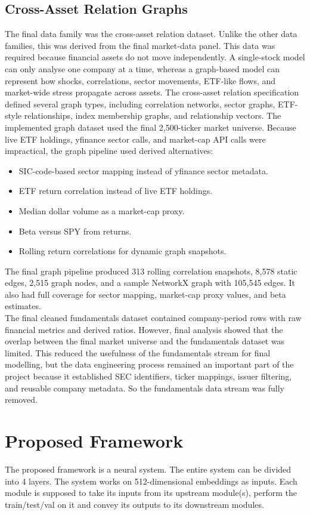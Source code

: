 \documentclass[conference]{IEEEtran}
\begin{document}
\subsection{Cross-Asset Relation Graphs}
The final data family was the cross-asset relation dataset. Unlike the other data families, this was derived from the final market-data panel. This data was required because financial assets do not move independently. A single-stock model can only analyse one company at a time, whereas a graph-based model can represent how shocks, correlations, sector movements, ETF-like flows, and market-wide stress propagate across assets. The cross-asset relation specification defined several graph types, including correlation networks, sector graphs, ETF-style relationships, index membership graphs, and relationship vectors. The implemented graph dataset used the final 2,500-ticker market universe. Because live ETF holdings, yfinance sector calls, and market-cap API calls were impractical, the graph pipeline used derived alternatives:
\begin{itemize}
    \item SIC-code-based sector mapping instead of yfinance sector metadata.
    \item ETF return correlation instead of live ETF holdings.
    \item Median dollar volume as a market-cap proxy.
    \item Beta versus SPY from returns.
    \item Rolling return correlations for dynamic graph snapshots. 
\end{itemize}
The final graph pipeline produced 313 rolling correlation snapshots, 8,578 static edges, 2,515 graph nodes, and a sample NetworkX graph with 105,545 edges. It also had full coverage for sector mapping, market-cap proxy values, and beta estimates.\\
The final cleaned fundamentals dataset contained company-period rows with raw financial metrics and derived ratios. However, final analysis showed that the overlap between the final market universe and the fundamentals dataset was limited. This reduced the usefulness of the fundamentals stream for final modelling, but the data engineering process remained an important part of the project because it established SEC identifiers, ticker mappings, issuer filtering, and reusable company metadata. So the fundamentals data stream was fully removed. 

\section{Proposed Framework}
The proposed framework is a neural system. The entire system can be divided into 4 layers. The system works on 512-dimensional embeddings as inputs. Each module is supposed to take its inputs from its upstream module(s), perform the train/test/val on it and convey its outputs to its downstream modules.
\end{document}
